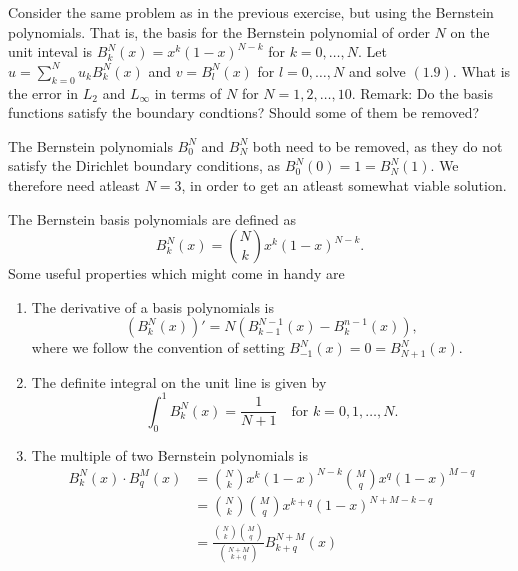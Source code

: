 \begin{exercise}
    Consider the same problem as in the previous exercise, but using the Bernstein polynomials.
    That is, the basis for the Bernstein polynomial of order $N$ on the unit inteval is $B_k^N(x) = x^k (1 - x)^{N - k}$ for $k = 0, \ldots, N$.
    Let $u = \sum_{k = 0}^N u_k B_k^N(x)$ and $v = B_l^N(x)$ for $l = 0, \ldots, N$ and solve $(1.9)$.
    What is the error in $L_2$ and $L_\infty$ in terms of $N$ for $N = 1, 2, \ldots, 10$.
    Remark: Do the basis functions satisfy the boundary condtions? Should some of them be removed?
\end{exercise}

\begin{solution}
    The Bernstein polynomials $B_0^N$ and $B_N^N$ both need to be removed, as they do not satisfy the Dirichlet boundary conditions, as $B_0^N(0)  = 1 = B_N^N(1)$.
    We therefore need atleast $N = 3$, in order to get an atleast somewhat viable solution.

    The Bernstein basis polynomials are defined as
    \begin{equation*}
        B_k^N(x) = \binom{N}{k} x^k (1 - x)^{N - k}.
    \end{equation*}
    Some useful properties which might come in handy are
    \begin{enumerate}
        \item The derivative of a basis polynomials is
            \begin{equation*}
                \left( B_k^N(x) \right)' = N \left( B_{k-1}^{N-1}(x) - B_{k}^{n-1}(x) \right),
            \end{equation*}
            where we follow the convention of setting $B_{-1}^N(x) = 0 = B_{N+1}^N(x)$.

        \item The definite integral on the unit line is given by
            \begin{equation*}
                \int_0^1 B_{k}^N(x) = \frac{1}{N+1} \quad \text{for } k = 0, 1, \ldots, N.
            \end{equation*}

        \item The multiple of two Bernstein polynomials is
            \begin{align*}
                B_k^N(x) \cdot B_q^M(x) &= \binom{N}{k} x^k (1 - x)^{N - k} \binom{M}{q} x^q (1 - x)^{M - q} \\
                &= \binom{N}{k} \binom{M}{q} x^{k+q} (1 - x)^{N + M - k - q} \\
                &= \frac{\binom{N}{k}\binom{M}{q}}{\binom{N + M}{k + q}} B_{k+q}^{N + M}(x)
            \end{align*}
    \end{enumerate}


\end{solution}
